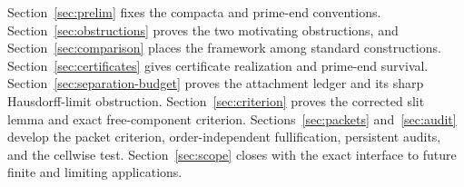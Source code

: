 Section~\ref{sec:prelim} fixes the compacta and prime-end conventions.
Section~\ref{sec:obstructions} proves the two motivating obstructions, and
Section~\ref{sec:comparison} places the framework among standard
constructions.  Section~\ref{sec:certificates} gives certificate realization
and prime-end survival.  Section~\ref{sec:separation-budget} proves the
attachment ledger and its sharp Hausdorff-limit obstruction.
Section~\ref{sec:criterion} proves the corrected slit lemma and exact
free-component criterion.  Sections~\ref{sec:packets} and~\ref{sec:audit}
develop the packet criterion, order-independent fullification, persistent
audits, and the cellwise test.  Section~\ref{sec:scope} closes with the exact
interface to future finite and limiting applications.
